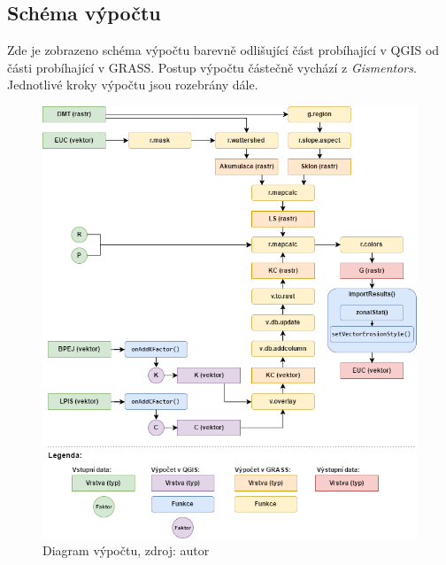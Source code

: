 \subsection{Schéma výpočtu} Zde je zobrazeno schéma výpočtu barevně
odlišující část probíhající v QGIS od části probíhající v
GRASS. Postup výpočtu částečně vychází z
\textit{Gismentors}\cite{gismentors}. Jednotlivé kroky výpočtu jsou
rozebrány dále.
\begin{figure}[H]
\centering \includegraphics[scale=0.6]{./pictures/diagram.png}
      \caption[Diagram výpočtu] {Diagram výpočtu, zdroj: autor}
      \label{diagram}
\end{figure}
\newpage
